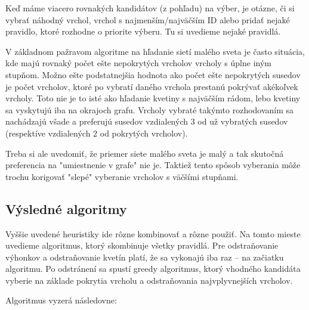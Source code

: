 Keď máme viacero rovnakých kandidátov (z pohľadu) na výber, je otázne, či si 
vybrať náhodný vrchol, vrchol s najmenším/najväčším ID alebo pridať nejaké 
pravidlo, ktoré rozhodne o priorite výberu. Tu si uvedieme nejaké pravidlá.

V základnom pažravom algoritme na hľadanie sietí malého sveta je často 
situácia, kde majú rovnaký počet ešte nepokrytých vrcholov vrcholy s úplne 
iným stupňom. Možno ešte podstatnejšia hodnota ako počet ešte nepokrytých 
susedov je počet vrcholov, ktoré po vybratí daného vrchola prestanú pokrývať 
akékoľvek vrcholy. Toto nie je to isté ako hľadanie kvetiny s najväčším rádom, 
lebo kvetiny sa vyskytujú iba na okrajoch grafu. Vrcholy vybraté takýmto 
rozhodovaním sa nachádzajú všade a preferujú susedov vzdialených 3 od už 
vybratých susedov (respektíve vzdialených 2 od pokrytých vrcholov). 

Treba si ale uvedomiť, že priemer siete malého sveta je malý a tak skutočná 
preferencia na "umiestnenie v grafe" nie je. Taktiež tento spôsob vyberania 
môže trochu korigovať "slepé" vyberanie vrcholov s väčšími stupňami.

\subsection{Výsledné algoritmy}

Vyššie uvedené heuristiky ide rôzne kombinovať a rôzne použiť. Na tomto mieste 
uvedieme algoritmus, ktorý skombinuje všetky pravidlá. Pre odstraňovanie 
výhonkov a odstraňovanie kvetín platí, že sa vykonajú iba raz -- na začiatku 
algoritmu. Po odstránení sa spustí greedy algoritmus, ktorý vhodného kandidáta 
vyberie na základe pokrytia vrcholu a odstraňovania najvplyvnejších vrcholov.

Algoritmus vyzerá následovne:

